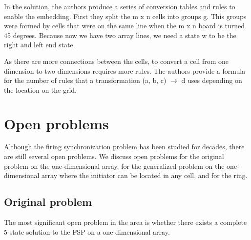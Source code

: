 \documentclass{article}
\begin{document}



In the solution, the authors produce a series of conversion tables and rules to enable the embedding. First they split the m x n cells into groups g. This groups were formed by cells that were on the same line when the m x n board is turned 45 degrees. Because now we have two array lines, we need a state w to be the right and left end state.


As there are more connections between the cells, to convert a cell from one dimension to two dimensions requires more rules. The authors provide a formula for the number of rules that a transformation (a, b, c) $\rightarrow$ d uses depending on the location on the grid.



\section{Open problems}
Although the firing synchronization problem has been studied for decades, there are still several open problems. We discuss open problems for the original problem on the one-dimensional array, for the generalized problem on the one-dimensional array where the initiator can be located in any cell, and for the ring.

\subsection{Original problem}
The most significant open problem in the area is whether there exists a complete 5-state solution to the FSP on a one-dimensional array.
\end{document}
